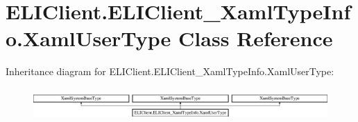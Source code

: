 \hypertarget{class_e_l_i_client_1_1_e_l_i_client___xaml_type_info_1_1_xaml_user_type}{}\section{E\+L\+I\+Client.\+E\+L\+I\+Client\+\_\+\+Xaml\+Type\+Info.\+Xaml\+User\+Type Class Reference}
\label{class_e_l_i_client_1_1_e_l_i_client___xaml_type_info_1_1_xaml_user_type}
Inheritance diagram for E\+L\+I\+Client.\+E\+L\+I\+Client\+\_\+\+Xaml\+Type\+Info.\+Xaml\+User\+Type\+:\begin{figure}[H]
\begin{center}
\leavevmode
\includegraphics[height=1.269841cm]{d3/d57/class_e_l_i_client_1_1_e_l_i_client___xaml_type_info_1_1_xaml_user_type}
\end{center}
\end{figure}
